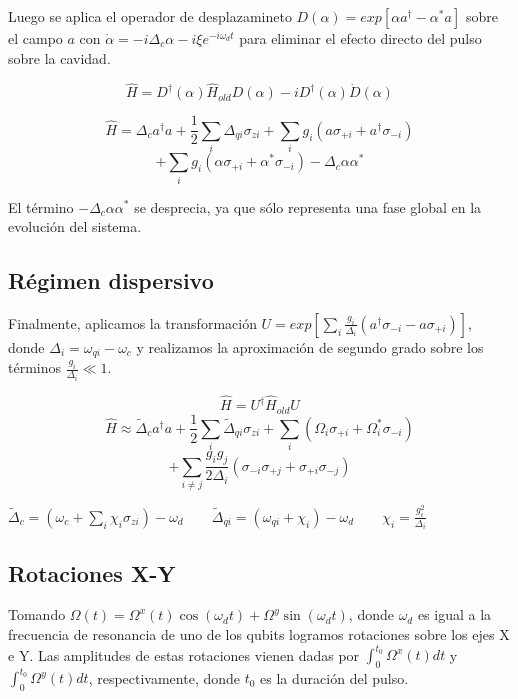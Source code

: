 Luego se aplica el operador de desplazamineto $D(\alpha) = exp[\alpha a^\dagger - \alpha^* a]$ sobre el campo $a$ con $\dot{\alpha} = -i \Delta_c \alpha -i \xi e^{-i \omega_d t}$ para eliminar el efecto directo del pulso sobre la cavidad.

$$\hat{H} = D^\dagger (\alpha) \hat{H}_{old} D(\alpha) -i D^\dagger(\alpha) \dot{D}(\alpha)$$

$$\hat{H} = \Delta_c a^\dagger a + \frac{1}{2} \sum\limits_i \Delta_{qi} \sigma_{zi} + \sum\limits_i g_i (a \sigma_{+i} + a^\dagger \sigma_{-i})$$
$$ + \sum\limits_i g_i (\alpha \sigma_{+i} + \alpha^* \sigma_{-i}) - \Delta_c \alpha \alpha^* $$

El término $-\Delta_c \alpha \alpha^*$ se desprecia, ya que sólo representa una fase global en la evolución del sistema.

\subsection{Régimen dispersivo}

Finalmente, aplicamos la transformación $U = exp[\sum\limits_i \frac{g_i} {\Delta_i} (a^\dagger \sigma_{-i} - a \sigma_{+i})]$, donde $\Delta_i = \omega_{qi} - \omega_c$ y realizamos la aproximación de segundo grado sobre los términos $\frac{g_i}{\Delta_i} \ll 1$.

$$\hat{H} = U^\dagger \hat{H}_{old} U$$
$$\hat{H} \approx \tilde{\Delta}_c a^\dagger a + \frac{1}{2} \sum\limits_i \tilde{\Delta}_{qi} \sigma_{zi} + \sum\limits_i (\Omega_i \sigma_{+i} + \Omega_i^* \sigma_{-i})$$
$$+ \sum\limits_{i \neq j} \frac{g_i g_j}{2 \Delta_i} (\sigma_{-i} \sigma_{+j}+\sigma_{+i} \sigma_{-j})$$

$\tilde{\Delta}_c = (\omega_c + \sum\limits_i \chi_i \sigma_{zi}) - \omega_d
 \qquad
 \tilde{\Delta}_{qi} = (\omega_{qi} + \chi_i) - \omega_d
 \qquad
 \chi_i = \frac{g_i^2}{\Delta_i}$

\subsection{Rotaciones X-Y}

Tomando $\Omega(t) = \Omega^x(t) \cos(\omega_d t) + \Omega^y \sin(\omega_d t)$, donde $\omega_d$ es igual a la frecuencia de resonancia de uno de los qubits logramos rotaciones sobre los ejes X e Y. Las amplitudes de estas rotaciones vienen dadas por $\int_0^{t_0} \Omega^x(t) dt$ y $\int_0^{t_0} \Omega^y(t) dt$, respectivamente, donde $t_0$ es la duración del pulso.

